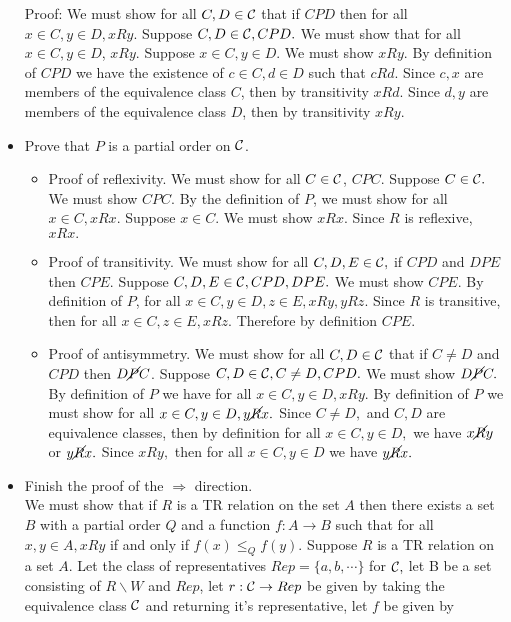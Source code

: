 \documentclass[12pt, letterpaper]{article}
\begin{document}
\begin{itemize}
		Proof: We must show for all $C, D \in {\cal C}$ that if $C P D$ then for all $x \in C, y \in D, xRy.$ Suppose $C,D \in {\cal C}, CPD.$  We must show that for all $x \in C, y \in D$, $xRy.$  Suppose $x \in C, y \in D.$  We must show $xRy.$  By definition of $CPD$ we have the existence of $c \in C, d \in D$ such that $c R d.$  Since $c,x$ are members of the equivalence class $C$, then by transitivity $xRd.$  Since $d,y$ are members of the equivalence class $D$, then by transitivity $xRy.$
		\item Prove that $P$ is a partial order on ${\cal C}$.
		\begin{itemize}
			\item Proof of reflexivity.  We must show for all $C \in \cal C$, $C P C.$  Suppose $C \in \cal C.$  We must show $C P C.$  By the definition of $P$, we must show for all $x \in C, xRx.$  Suppose $x \in C.$  We must show $xRx.$  Since $R$ is reflexive, $xRx.$
			\item Proof of transitivity.  We must show for all $C, D, E \in \cal C,$ if $C P D$ and $D P E$ then $C P E.$  Suppose $C, D, E \in {\cal C}, C P D, D P E.$  We must show $CPE.$  By definition of $P$, for all $x \in C, y \in D, z \in E, xRy, yRz.$  Since $R$ is transitive, then for all $x \in C, z \in E, xRz.$  Therefore by definition $C P E.$
			\item Proof of antisymmetry.  We must show for all $C,D \in \cal C$ that if $C \neq D$ and $C P D$ then $D \cancel{P} C$.  Suppose $C,D \in {\cal C}, C \neq D, C P D.$  We must show $D \cancel{P} C.$  By definition of $P$ we have for all $x \in C, y \in D, x R y.$  By definition of $P$ we must show for all $x \in C, y \in D, y \cancel{R} x.$  Since $C \neq D,$ and $C,D$ are equivalence classes, then by definition for all $x \in C, y \in D,$ we have $x \cancel{R} y$ or $y \cancel{R} x.$  Since $x R y, $ then for all $x \in C, y \in D$ we have $y \cancel{R} x.$  
		\end{itemize}
		\item Finish the proof of the $\Rightarrow$ direction. \\
		We must show that if $R$ is a TR relation on the set $A$ then there exists a set $B$ with a partial order $Q$ and a function $f: A \to B$ such that for all $x,y \in A, xRy$ if and only if $f(x) \leq_Q f(y)$.  Suppose $R$ is a TR relation on a set $A$.   Let the class of representatives $Rep = \{a,b,\cdots\}$ for $\cal C,$ let B be a set consisting of $R \backslash W$ and $Rep$, let $r: {\cal C} \to Rep$ be given by taking the equivalence class $\cal C$ and returning it's representative, let $f$ be given by 

\end{itemize}
\end{document}
